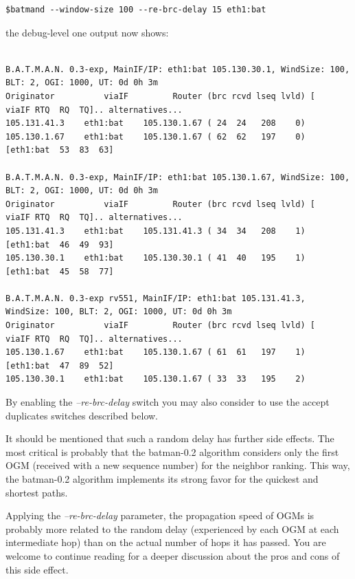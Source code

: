 \documentclass[11pt]{article}
\begin{document}
\begin{small}
\begin{verbatim}
$batmand --window-size 100 --re-brc-delay 15 eth1:bat
\end{verbatim}
\end{small}
%
the debug-level one output now shows:
%
\begin{small}
\begin{verbatim}

B.A.T.M.A.N. 0.3-exp, MainIF/IP: eth1:bat 105.130.30.1, WindSize: 100, BLT: 2, OGI: 1000, UT: 0d 0h 3m
Originator          viaIF         Router (brc rcvd lseq lvld) [   viaIF RTQ  RQ  TQ].. alternatives...
105.131.41.3    eth1:bat    105.130.1.67 ( 24  24   208    0)
105.130.1.67    eth1:bat    105.130.1.67 ( 62  62   197    0) [eth1:bat  53  83  63]

B.A.T.M.A.N. 0.3-exp, MainIF/IP: eth1:bat 105.130.1.67, WindSize: 100, BLT: 2, OGI: 1000, UT: 0d 0h 3m
Originator          viaIF         Router (brc rcvd lseq lvld) [   viaIF RTQ  RQ  TQ].. alternatives...
105.131.41.3    eth1:bat    105.131.41.3 ( 34  34   208    1) [eth1:bat  46  49  93]
105.130.30.1    eth1:bat    105.130.30.1 ( 41  40   195    1) [eth1:bat  45  58  77]

B.A.T.M.A.N. 0.3-exp rv551, MainIF/IP: eth1:bat 105.131.41.3, WindSize: 100, BLT: 2, OGI: 1000, UT: 0d 0h 3m
Originator          viaIF         Router (brc rcvd lseq lvld) [   viaIF RTQ  RQ  TQ].. alternatives...
105.130.1.67    eth1:bat    105.130.1.67 ( 61  61   197    1) [eth1:bat  47  89  52]
105.130.30.1    eth1:bat    105.130.1.67 ( 33  33   195    2)

\end{verbatim}
\end{small}

By enabling the \emph{--re-brc-delay} switch you may also consider to use the accept duplicates switches described below.

It should be mentioned that such a random delay has further side effects.
The most critical is probably that the batman-0.2 algorithm considers only the first OGM (received with a new sequence number) for the neighbor ranking. This way, the batman-0.2 algorithm implements its strong favor for the
quickest and shortest paths.

Applying the \emph{--re-brc-delay} parameter, the propagation speed of OGMs is probably more related to the random delay (experienced by each OGM at each intermediate hop) than on the actual number of hops it has passed. You are welcome to continue reading for a deeper discussion about the pros and cons of this side effect.
\end{document}
